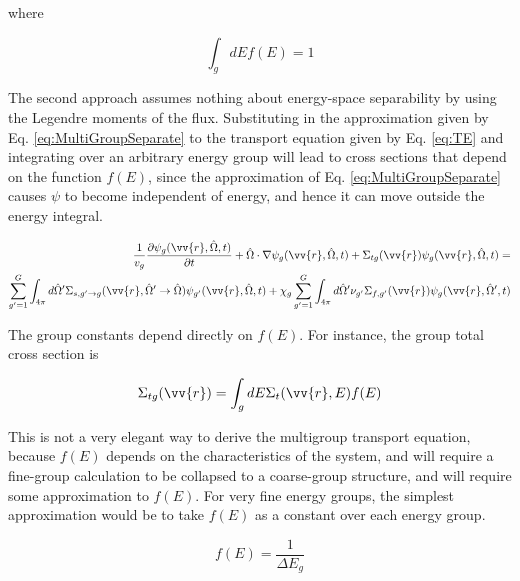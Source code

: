 \documentclass[10pt]{article}
\begin{document}
\begin{flushleft}
where

\begin{equation}
\label{eq:f_E_normalized}
\int_{g} dEf(E) = 1
\end{equation}

The second approach assumes nothing about energy-space separability by using the Legendre moments of the flux. Substituting in the approximation given by Eq. \ref{eq:MultiGroupSeparate} to the transport equation given by Eq. \ref{eq:TE} and integrating over an arbitrary energy group will lead to cross sections that depend on the function \(f(E)\), since the approximation of Eq. \ref{eq:MultiGroupSeparate} causes \(\psi\) to become independent of energy, and hence it can move outside the energy integral.

\begin{equation}
\label{eq:multigroupTE1}
\begin{aligned}
\frac{1}{v_g}\frac{\partial \psi_g(\vv{r}, \hat{\Omega}, t)}{\partial t} + \hat{\Omega}\cdot\nabla\psi_g(\vv{r}, \hat{\Omega}, t) + \Sigma_{tg}(\vv{r})\psi_g(\vv{r}, \hat{\Omega}, t) =\\
\sum_{g'=1}^{G} \int_{4\pi}^{} d\hat{\Omega}' \Sigma_{s, g'\rightarrow g}(\vv{r}, \hat{\Omega}' \rightarrow\hat{\Omega})\psi_{g'}(\vv{r}, \hat{\Omega}, t) + \chi_g \sum_{g'=1}^{G}\int_{4\pi}^{} d\hat{\Omega}' \nu_{g'}\Sigma_{f,g'}(\vv{r})\psi_g(\vv{r}, \hat{\Omega}', t)
\end{aligned}
\end{equation}

The group constants depend directly on \(f(E)\). For instance, the group total cross section is

\begin{equation}
\label{eq:multigroupTE1_constants1}
\Sigma_{tg}(\vv{r}) = \int_{g} dE \Sigma_t(\vv{r}, E) f(E)
\end{equation}

This is not a very elegant way to derive the multigroup transport equation, because \(f(E)\) depends on the characteristics of the system, and will require a fine-group calculation to be collapsed to a coarse-group structure, and will require some approximation to \(f(E)\). For very fine energy groups, the simplest approximation would be to take \(f(E)\) as a constant over each energy group.

\begin{equation}
\label{eq:FineGroupf_E}
f(E) = \frac{1}{\Delta E_g}
\end{equation}


\end{flushleft}
\end{document}
